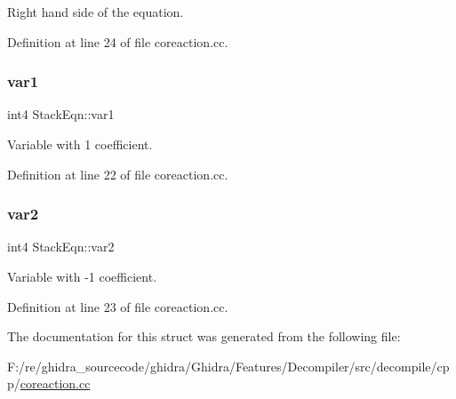 Right hand side of the equation. 



Definition at line 24 of file coreaction.\+cc.

\mbox{\label{struct_stack_eqn_a1253961b333617e44f2b5d564aac24cf}} 
\subsubsection{\texorpdfstring{var1}{var1}}
{\footnotesize\ttfamily int4 Stack\+Eqn\+::var1}



Variable with 1 coefficient. 



Definition at line 22 of file coreaction.\+cc.

\mbox{\label{struct_stack_eqn_abc7b655e450f6f406111c4ca07366c37}} 
\subsubsection{\texorpdfstring{var2}{var2}}
{\footnotesize\ttfamily int4 Stack\+Eqn\+::var2}



Variable with -\/1 coefficient. 



Definition at line 23 of file coreaction.\+cc.



The documentation for this struct was generated from the following file\+:\begin{DoxyCompactItemize}
\item 
F\+:/re/ghidra\+\_\+sourcecode/ghidra/\+Ghidra/\+Features/\+Decompiler/src/decompile/cpp/\mbox{\hyperlink{coreaction_8cc}{coreaction.\+cc}}\end{DoxyCompactItemize}
